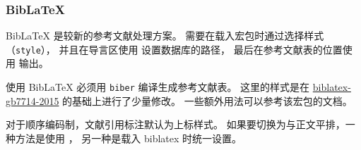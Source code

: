 \documentclass[a4paper]{ltxdoc}
\DeclareRobustCommand\file{\nolinkurl}
\DeclareRobustCommand\pkg{\textsf}
\DeclareRobustCommand\opt{\texttt}
\begin{document}
\subsubsection{BibLaTeX}

BibLaTeX 是较新的参考文献处理方案。
需要在载入宏包时通过选择样式（\opt{style}），
并且在导言区使用  设置数据库的路径，
最后在参考文献表的位置使用  输出。
\begin{latex}
  \usepackage[style=ustcthesis-authoryear]{biblatex}
  
\end{latex}
使用 BibLaTeX 必须用 \file{biber} 编译生成参考文献表。
这里的样式是在 \href{https://ctan.org/pkg/biblatex-gb7714-2015}{biblatex-gb7714-2015}
的基础上进行了少量修改。
一些额外用法可以参考该宏包的文档。

对于顺序编码制，文献引用标注默认为上标样式。
如果要切换为与正文平排，一种方法是使用 ，
另一种是载入 \pkg{biblatex} 时统一设置。
\begin{latex}
  \usepackage[style=ustcthesis-numeric, inline=true]{biblatex}
\end{latex}
\end{document}
